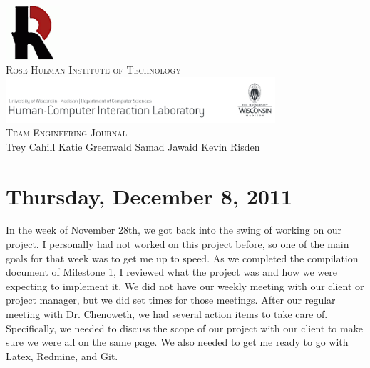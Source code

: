 \documentclass{article}
\begin{document}
\begin{titlepage}
\begin{center}
\includegraphics[width=0.15\textwidth]{images/rh}\\[1.0cm]
\textsc{\large Rose-Hulman Institute of Technology}\\[1.5cm]
\includegraphics[width=0.75\textwidth]{images/pss}\\[1.0cm]
\textsc{\large Team Engineering Journal}\\[1.0cm]
\large Trey Cahill \hspace{0.2cm} Katie Greenwald \hspace{0.2cm} Samad Jawaid \hspace{0.2cm} Kevin Risden
\end{center}
\end{titlepage}
\newpage

\section{Thursday, December 8, 2011}
In the week of November 28th, we got back into the swing of working on our project. I
personally had not worked on this project before, so one of the main goals for that
week was to get me up to speed. As we completed the compilation document of Milestone
1, I reviewed what the project was and how we were expecting to implement it. We did
not have our weekly meeting with our client or project manager, but we did set times
for those meetings. After our regular meeting with Dr. Chenoweth, we had several
action items to take care of. Specifically, we needed to discuss the scope of our
project with our client to make sure we were all on the same page. We also needed to
get me ready to go with Latex, Redmine, and Git.
\end{document}
